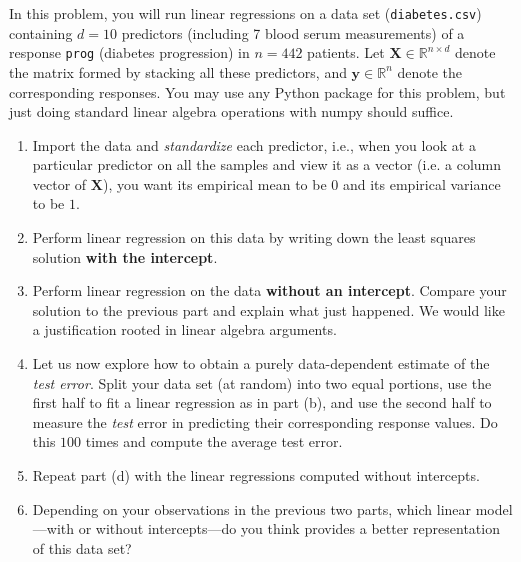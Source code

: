 \documentclass[11pt,twoside]{article}
\begin{document}
In this problem, you will run linear regressions on a data set ({\tt diabetes.csv}) containing $d = 10$ predictors (including 7 blood serum measurements) of a response {\tt prog} (diabetes progression) in $n = 442$ patients. Let $\mathbf{X} \in \mathbb{R}^{n \times d}$ denote the matrix formed by stacking all these predictors, and $\mathbf{y} \in \mathbb{R}^n$ denote the corresponding responses. You may use any Python package for this problem, but just doing standard linear algebra operations with numpy should suffice.
\begin{enumerate}[label=(\alph*)]
        \item Import the data and \emph{standardize} each predictor, i.e., when you look at a particular predictor on all the samples and view it as a vector (i.e. a column vector of $\mathbf{X}$), you want its empirical mean to be $0$ and its empirical variance to be $1$.
        \item Perform linear regression on this data by writing down the least squares solution {\bf with the intercept}.
        \item Perform linear regression on the data {\bf without an intercept}. Compare your solution to the previous part and explain what just happened. We would like a justification rooted in linear algebra arguments.
        \item Let us now explore how to obtain a purely data-dependent estimate of the \emph{test error}. Split your data set (at random) into two equal portions, use the first half to fit a linear regression as in part (b), and use the second half to measure the {\it test} error in predicting their corresponding response values. Do this $100$ times and compute the average test error.
        \item Repeat part (d) with the linear regressions computed without intercepts.
        \item Depending on your observations in the previous two parts, which linear model---with or without intercepts---do you think provides a better representation of this data set?
\end{enumerate}
\end{document}
